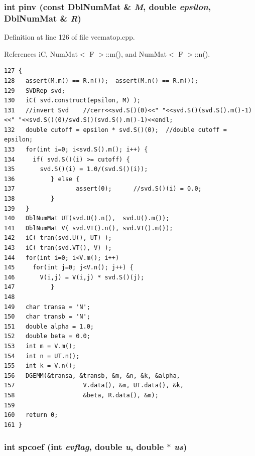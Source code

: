 \subsubsection{\setlength{\rightskip}{0pt plus 5cm}int pinv (const {\bf Dbl\-Num\-Mat} \& {\em M}, double {\em epsilon}, {\bf Dbl\-Num\-Mat} \& {\em R})}\label{vecmatop_8hpp_e6044a83323bd043a807de27d79c4365_e6044a83323bd043a807de27d79c4365}




Definition at line 126 of file vecmatop.cpp.

References i\-C, Num\-Mat$<$ F $>$::m(), and Num\-Mat$<$ F $>$::n().

\footnotesize\begin{verbatim}127 {
128   assert(M.m() == R.n());  assert(M.n() == R.m());
129   SVDRep svd;
130   iC( svd.construct(epsilon, M) );
131   //invert Svd    //cerr<<svd.S()(0)<<" "<<svd.S()(svd.S().m()-1)<<" "<<svd.S()(0)/svd.S()(svd.S().m()-1)<<endl;
132   double cutoff = epsilon * svd.S()(0);  //double cutoff = epsilon;
133   for(int i=0; i<svd.S().m(); i++) {
134     if( svd.S()(i) >= cutoff) {
135       svd.S()(i) = 1.0/(svd.S()(i));
136          } else {
137                 assert(0);      //svd.S()(i) = 0.0;
138          }
139   }
140   DblNumMat UT(svd.U().n(),  svd.U().m());
141   DblNumMat V( svd.VT().n(), svd.VT().m());
142   iC( tran(svd.U(), UT) );
143   iC( tran(svd.VT(), V) );
144   for(int i=0; i<V.m(); i++)
145     for(int j=0; j<V.n(); j++) {
146       V(i,j) = V(i,j) * svd.S()(j);
147          }
148   
149   char transa = 'N';
150   char transb = 'N';
151   double alpha = 1.0;
152   double beta = 0.0;
153   int m = V.m();
154   int n = UT.n();
155   int k = V.n();
156   DGEMM(&transa, &transb, &m, &n, &k, &alpha,
157                   V.data(), &m, UT.data(), &k, 
158                   &beta, R.data(), &m);  
159   
160   return 0;
161 }
\end{verbatim}\normalsize 


\subsubsection{\setlength{\rightskip}{0pt plus 5cm}int spcoef (int {\em evflag}, double {\em u}, double $\ast$ {\em us})}\label{vecmatop_8hpp_9084d4f8c569a1ae492c9b1f315df7c1_9084d4f8c569a1ae492c9b1f315df7c1}





